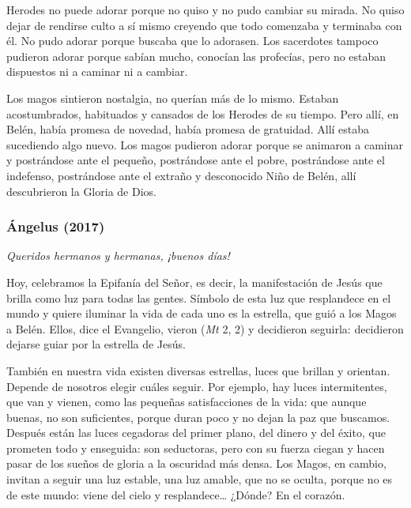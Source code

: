 \begin{body}
\begin{body}
{Herodes no puede adorar porque no quiso y no pudo cambiar su mirada. No quiso dejar de rendirse culto a sí mismo creyendo que todo comenzaba y terminaba con él. No pudo adorar porque buscaba que lo adorasen. Los sacerdotes tampoco pudieron adorar porque sabían mucho, conocían las profecías, pero no estaban dispuestos ni a caminar ni a cambiar.

Los magos sintieron nostalgia, no querían más de lo mismo. Estaban acostumbrados, habituados y cansados de los Herodes de su tiempo. Pero allí, en Belén, había promesa de novedad, había promesa de gratuidad. Allí estaba sucediendo algo nuevo. Los magos pudieron adorar porque se animaron a caminar y postrándose ante el pequeño, postrándose ante el pobre, postrándose ante el indefenso, postrándose ante el extraño y desconocido Niño de Belén, allí descubrieron la Gloria de Dios.

\subsubsection{Ángelus (2017)} \emph{Queridos hermanos y hermanas, ¡buenos días!}

Hoy, celebramos la Epifanía del Señor, es decir, la manifestación de Jesús que brilla como luz para todas las gentes. Símbolo de esta luz que resplandece en el mundo y quiere iluminar la vida de cada uno es la estrella, que guió a los Magos a Belén. Ellos, dice el Evangelio, vieron  (\emph{Mt} 2, 2) y decidieron seguirla: decidieron dejarse guiar por la estrella de Jesús.

También en nuestra vida existen diversas estrellas, luces que brillan y orientan. Depende de nosotros elegir cuáles seguir. Por ejemplo, hay luces intermitentes, que van y vienen, como las pequeñas satisfacciones de la vida: que aunque buenas, no son suficientes, porque duran poco y no dejan la paz que buscamos. Después están las luces cegadoras del primer plano, del dinero y del éxito, que prometen todo y enseguida: son seductoras, pero con su fuerza ciegan y hacen pasar de los sueños de gloria a la oscuridad más densa. Los Magos, en cambio, invitan a seguir una luz estable, una luz amable, que no se oculta, porque no es de este mundo: viene del cielo y resplandece\ldots{} ¿Dónde? En el corazón.

}
\end{body}
\end{body}
